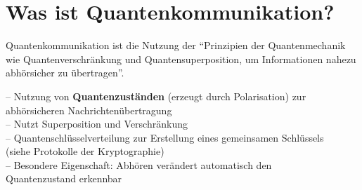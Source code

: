 \section{Was ist Quantenkommunikation?}
\begin{frame}
	\begin{Definition}
		Quantenkommunikation ist die Nutzung der \enquote{Prinzipien der Quantenmechanik wie Quantenverschr{\"a}nkung und Quantensuperposition, um Informationen nahezu abh{\"o}rsicher zu {\"u}bertragen}.\cite{frauenhofer2025}
	\end{Definition}
	\pause
	-- Nutzung von \textbf{Quantenzust{\"a}nden} (erzeugt durch Polarisation) zur\\
		\hspace{0.5em} abh{\"o}rsicheren Nachrichten{\"u}bertragung\\
	\vspace{0.5em}
	-- Nutzt Superposition und Verschr{\"a}nkung\\
	\vspace{0.5em}
	-- Quantenschl{\"u}sselverteilung zur Erstellung eines gemeinsamen Schl{\"u}ssels\\ 
	\vspace{0.5em}
		\hspace{0.5em} (siehe Protokolle der Kryptographie)\\
	-- Besondere Eigenschaft: Abh{\"o}ren ver{\"a}ndert automatisch den\\ 
		\hspace{0.5em} Quantenzustand \textrightarrow { }erkennbar
\end{frame}

